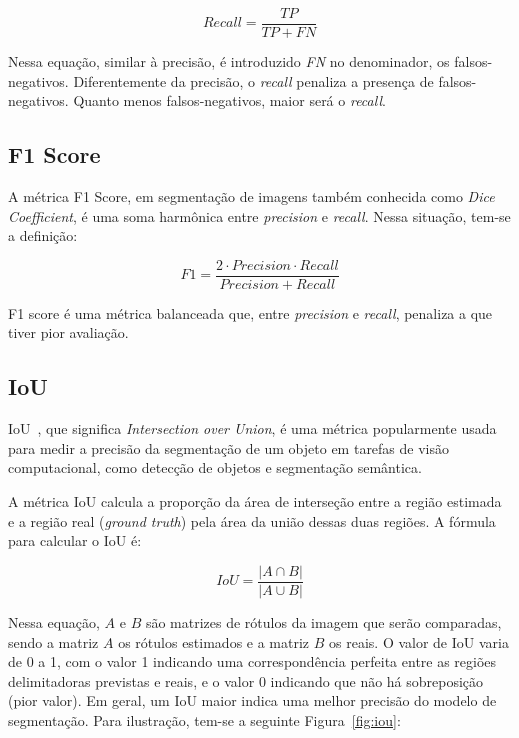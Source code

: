 \begin{equation}\label{eq:recall}
  Recall = \dfrac{TP}{TP + FN}
\end{equation}

Nessa equação, similar à precisão, é introduzido \textit{FN} no denominador,
os falsos-negativos. Diferentemente da precisão, o \textit{recall} penaliza
a presença de falsos-negativos. Quanto menos falsos-negativos, maior
será o \textit{recall}.

\subsection{F1 Score}\label{sec:f1}

A métrica F1 Score, em segmentação de imagens também conhecida como
\textit{Dice Coefficient}, é uma soma harmônica entre \textit{precision} e
\textit{recall}. Nessa situação, tem-se a definição:


\begin{equation}\label{eq:recall}
  F1 = \dfrac{2 \cdot Precision \cdot Recall}{Precision + Recall}
\end{equation}

F1 score é uma métrica balanceada que, entre \textit{precision} e \textit{recall},
penaliza a que tiver pior avaliação.

\subsection{IoU}\label{sec:iou}

IoU~\cite{rezatofighi2019generalized}, que significa
\textit{Intersection over Union}, é uma métrica popularmente usada
para medir a precisão da segmentação de um objeto em tarefas de visão
computacional, como detecção de objetos e segmentação semântica.

A métrica IoU calcula a proporção da área de interseção entre a região
estimada e a região real (\textit{ground truth}) pela área da união dessas duas
regiões. A fórmula para calcular o IoU é:

\begin{equation}\label{eq:iou}
  IoU = \dfrac{\left| A \cap B \right|}{\left| A \cup B \right|}
\end{equation}


Nessa equação, $A$ e $B$ são matrizes de rótulos da imagem que serão
comparadas, sendo a matriz $A$ os rótulos estimados e a matriz $B$ os
reais. O valor de IoU varia de 0 a 1, com o valor 1 indicando uma
correspondência perfeita entre as regiões delimitadoras previstas e
reais, e o valor 0 indicando que não há sobreposição (pior valor). Em
geral, um IoU maior indica uma melhor precisão do modelo de
segmentação. Para ilustração, tem-se a seguinte Figura~\ref{fig:iou}:

